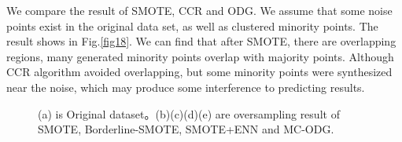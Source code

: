 \documentclass[runningheads]{llncs}
\begin{document}
We compare the result of SMOTE, CCR and ODG. We assume that some noise points exist in the original data set, 
as well as clustered minority points. The result shows in Fig.\ref{fig18}. 
We can find that after SMOTE, there are overlapping regions, many generated minority points 
overlap with majority points.
Although CCR algorithm avoided overlapping, 
but some minority points were synthesized near the noise, which may produce some interference to predicting results.
\begin{figure}[tb]
  \centering
  \quad
  \quad

  \quad
  \quad
  \caption{(a) is Original dataset。(b)(c)(d)(e) are oversampling result of SMOTE, 
  Borderline-SMOTE, SMOTE+ENN and MC-ODG.}
  \label{fig17}
  \end{figure}
\end{document}

